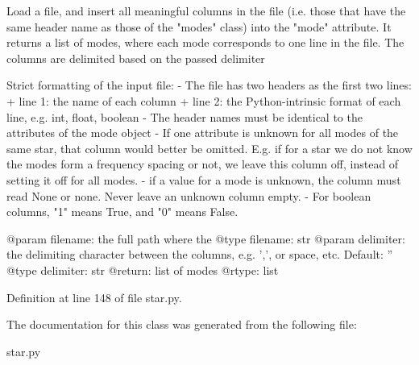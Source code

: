 \begin{DoxyVerb}Load a file, and insert all meaningful columns in the file (i.e. those that have the same header name
as those of the "modes" class) into the "mode" attribute. It returns a list of modes, where each mode
corresponds to one line in the file. The columns are delimited based on the passed delimiter

Strict formatting of the input file:
- The file has two headers as the first two lines:
  + line 1: the name of each column
  + line 2: the Python-intrinsic format of each line, e.g. int, float, boolean
- The header names must be identical to the attributes of the mode object
- If one attribute is unknown for all modes of the same star, that column would better be omitted.
  E.g. if for a star we do not know the modes form a frequency spacing or not, we leave this column
  off, instead of setting it off for all modes.
- if a value for a mode is unknown, the column must read None or none. Never leave an unknown column
  empty.
- For boolean columns, "1" means True, and "0" means False.

@param filename: the full path where the 
@type filename: str
@param delimiter: the delimiting character between the columns, e.g. ',', or space, etc. Default: ''
@type delimiter: str
@return: list of modes
@rtype: list
\end{DoxyVerb}
 

Definition at line 148 of file star.\+py.



The documentation for this class was generated from the following file\+:\begin{DoxyCompactItemize}
\item 
star.\+py\end{DoxyCompactItemize}
